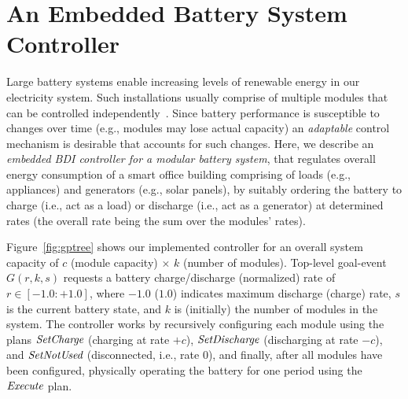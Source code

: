 \section{An Embedded Battery System Controller}\label{sec:application}


Large battery systems enable increasing levels of renewable energy in our electricity system. 
%
Such installations usually comprise of multiple modules that can be controlled independently~\cite{norris02:grid}. 
Since battery performance is susceptible to changes over time (e.g., modules may lose actual capacity) an \emph{adaptable} control mechanism is desirable that accounts for such changes.
%
Here, we describe an {\em embedded BDI controller for a modular battery system}, that regulates overall energy consumption of a smart office building comprising of loads (e.g., appliances) and generators (e.g., solar panels), by suitably ordering the battery to charge (i.e., act as a load) or discharge (i.e., act as a generator) at determined rates (the overall rate being the sum over the modules' rates).

Figure~\ref{fig:gptree} shows our implemented controller for an overall system capacity of $c$ (module capacity) $\times$ $k$ (number of modules). Top-level goal-event $G(r,k,s)$ requests a battery charge/discharge (normalized) rate of $r \in [-1.0:+1.0]$, where $-1.0$ ($1.0$) indicates maximum discharge (charge) rate, $s$ is the current battery state, and $k$ is (initially) the number of modules in the system. 
The controller works by recursively configuring each module using the plans $\operatorname{\textit{SetCharge}}$ (charging at rate $+c$), $\operatorname{\textit{SetDischarge}}$ (discharging at rate $-c$), and $\operatorname{\textit{SetNotUsed}}$ (disconnected, i.e., rate $0$), and finally, after all modules have been configured, physically operating the battery for one period using the $\operatorname{\textit{Execute}}$ plan. 

